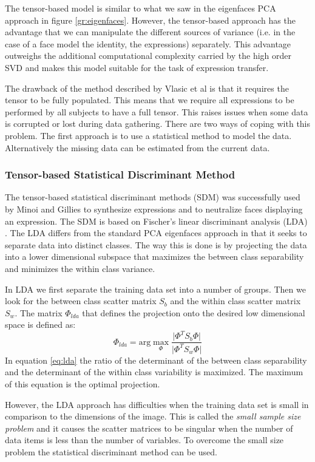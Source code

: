 \documentclass[11pt,a4paper]{report}
\begin{document}
The tensor-based model is
similar to what we saw in the eigenfaces PCA approach in figure
\ref{gr:eigenfaces}. However, the tensor-based approach has the advantage that
we can manipulate the different sources of variance (i.e. in the case of a face
model the identity, the
expressions) separately. This advantage outweighs the additional computational
complexity carried by the high order SVD and makes this model suitable for the
task of expression transfer.

The drawback of the method described by Vlasic et al is that it requires the
tensor to be fully populated. This means that we require all
expressions to be performed by all subjects to have a full tensor. This raises
issues when some data is corrupted or lost during data gathering. There are two
ways of coping with this problem. The first approach is to use a
statistical method to model the data. Alternatively the missing data can be estimated from the current data.
\subsubsection{Tensor-based Statistical Discriminant Method}
The tensor-based statistical discriminant methods (SDM) was successfully used by Minoi and Gillies
\cite{sdm,jacey} to synthesize expressions and to neutralize faces displaying an
expression. The SDM is based on Fischer's linear discriminant analysis (LDA) \cite{lda}. The LDA
differs from the standard PCA eigenfaces approach in that it seeks to separate
data into distinct classes. The way this is done is by projecting the data into
a lower dimensional subspace that maximizes the between class separability and
minimizes the within class variance.

In LDA we first separate the training data set into a number of groups. Then we
look for the between class scatter matrix $S_b$ and the within class scatter
matrix $S_w$. The matrix $\Phi_{lda}$ that defines the projection onto the desired low dimensional
space is defined as:
\begin{equation} \label{eq:lda}
\Phi_{lda} = \textrm{arg} \max_{\Phi}\frac{\lvert \Phi^T S_b \Phi \rvert}{\lvert \Phi^T S_w \Phi \rvert}
\end{equation}
In equation \ref{eq:lda} the ratio of the determinant of the between class
separability and the determinant of the within class variability is
maximized. The maximum of this equation is the optimal projection.

However, the LDA approach has difficulties when the training data set is small
in comparison to the dimensions of the image. This is called the \textit{small
sample size problem} and it causes the scatter matrices to be singular when the
number of data items is less than the number of variables. To overcome the small size problem the statistical discriminant method can be used.
\end{document}
